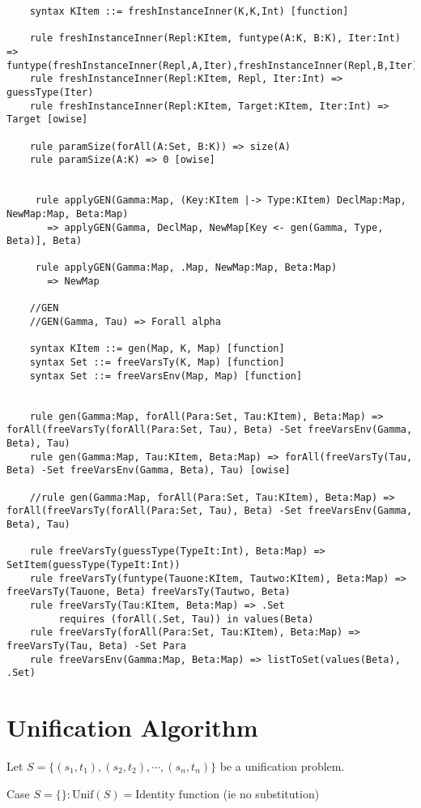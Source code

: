 \begin{lstlisting}
    syntax KItem ::= freshInstanceInner(K,K,Int) [function]

    rule freshInstanceInner(Repl:KItem, funtype(A:K, B:K), Iter:Int) => funtype(freshInstanceInner(Repl,A,Iter),freshInstanceInner(Repl,B,Iter))
    rule freshInstanceInner(Repl:KItem, Repl, Iter:Int) => guessType(Iter)
    rule freshInstanceInner(Repl:KItem, Target:KItem, Iter:Int) => Target [owise]

    rule paramSize(forAll(A:Set, B:K)) => size(A)
    rule paramSize(A:K) => 0 [owise]


     rule applyGEN(Gamma:Map, (Key:KItem |-> Type:KItem) DeclMap:Map, NewMap:Map, Beta:Map)
       => applyGEN(Gamma, DeclMap, NewMap[Key <- gen(Gamma, Type, Beta)], Beta)

     rule applyGEN(Gamma:Map, .Map, NewMap:Map, Beta:Map)
       => NewMap

    //GEN
    //GEN(Gamma, Tau) => Forall alpha

    syntax KItem ::= gen(Map, K, Map) [function]
    syntax Set ::= freeVarsTy(K, Map) [function]
    syntax Set ::= freeVarsEnv(Map, Map) [function]


    rule gen(Gamma:Map, forAll(Para:Set, Tau:KItem), Beta:Map) => forAll(freeVarsTy(forAll(Para:Set, Tau), Beta) -Set freeVarsEnv(Gamma, Beta), Tau)
    rule gen(Gamma:Map, Tau:KItem, Beta:Map) => forAll(freeVarsTy(Tau, Beta) -Set freeVarsEnv(Gamma, Beta), Tau) [owise]

    //rule gen(Gamma:Map, forAll(Para:Set, Tau:KItem), Beta:Map) => forAll(freeVarsTy(forAll(Para:Set, Tau), Beta) -Set freeVarsEnv(Gamma, Beta), Tau)

    rule freeVarsTy(guessType(TypeIt:Int), Beta:Map) => SetItem(guessType(TypeIt:Int))
    rule freeVarsTy(funtype(Tauone:KItem, Tautwo:KItem), Beta:Map) => freeVarsTy(Tauone, Beta) freeVarsTy(Tautwo, Beta)
    rule freeVarsTy(Tau:KItem, Beta:Map) => .Set
         requires (forAll(.Set, Tau)) in values(Beta)
    rule freeVarsTy(forAll(Para:Set, Tau:KItem), Beta:Map) => freeVarsTy(Tau, Beta) -Set Para
    rule freeVarsEnv(Gamma:Map, Beta:Map) => listToSet(values(Beta), .Set)
\end{lstlisting}
\section{Unification Algorithm}

Let $S = \{(s_1 , t_1), (s_2 , t_2), \cdots, (s_n , t_n)\}$ be a
unification problem.

Case $S = \{ \} : \text{Unif}(S) = \text{Identity function}$ (ie
no substitution)

